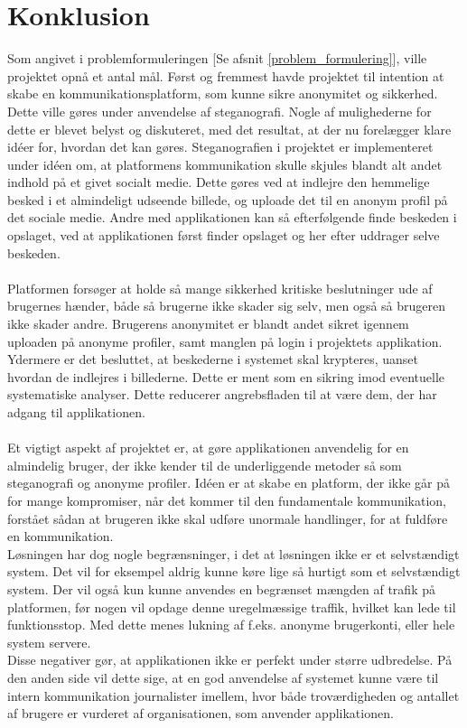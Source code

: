 \section{Konklusion}
Som angivet i problemformuleringen [Se afsnit \ref{problem_formulering}], ville projektet opnå et antal mål. Først og fremmest havde projektet til intention at skabe en kommunikationsplatform, som kunne sikre anonymitet og sikkerhed. Dette ville gøres under anvendelse af steganografi. Nogle af mulighederne for dette er blevet belyst og diskuteret, med det resultat, at der nu forelægger klare idéer for, hvordan det kan gøres. Steganografien i projektet er implementeret under idéen om, at platformens kommunikation skulle skjules blandt alt andet indhold på et givet socialt medie. Dette gøres ved at indlejre den hemmelige besked i et almindeligt udseende billede, og uploade det til en anonym profil på det sociale medie. Andre med applikationen kan så efterfølgende finde beskeden i opslaget, ved at applikationen først finder opslaget og her efter uddrager selve beskeden.\\\\
Platformen forsøger at holde så mange sikkerhed kritiske beslutninger ude af brugernes hænder, både så brugerne ikke skader sig selv, men også så brugeren ikke skader andre. Brugerens anonymitet er blandt andet sikret igennem uploaden på anonyme profiler, samt manglen på login i projektets applikation. Ydermere er det besluttet, at beskederne i systemet skal krypteres, uanset hvordan de indlejres i billederne. Dette er ment som en sikring imod eventuelle systematiske analyser. Dette reducerer angrebsfladen til at være dem, der har adgang til applikationen.\\\\
Et vigtigt aspekt af projektet er, at gøre applikationen anvendelig for en almindelig bruger, der ikke kender til de underliggende metoder så som steganografi og anonyme profiler. Idéen er at skabe en platform, der ikke går på for mange kompromiser, når det kommer til den fundamentale kommunikation, forstået sådan at brugeren ikke skal udføre unormale handlinger, for at fuldføre en kommunikation.\\
Løsningen har dog nogle begrænsninger, i det at løsningen ikke er et selvstændigt system. Det vil for eksempel aldrig kunne køre lige så hurtigt som et selvstændigt system. Der vil også kun kunne anvendes en begrænset mængden af trafik på platformen, før nogen vil opdage denne uregelmæssige traffik, hvilket kan lede til funktionsstop. Med dette menes lukning af f.eks. anonyme brugerkonti, eller hele system servere.\\
Disse negativer gør, at applikationen ikke er perfekt under større udbredelse. På den anden side vil dette sige, at en god anvendelse af systemet kunne være til intern kommunikation journalister imellem, hvor både troværdigheden og antallet af brugere er vurderet af organisationen, som anvender applikationen.